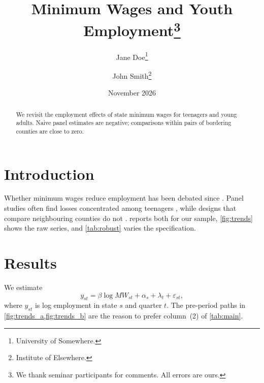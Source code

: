 \documentclass[11pt]{article}
\begin{document}
\title{Minimum Wages and Youth Employment\thanks{We thank seminar participants for comments. All errors are ours.}}
\author{Jane Doe\thanks{University of Somewhere.} \and John Smith\thanks{Institute of Elsewhere.}}
\date{November 2026}
\maketitle

\begin{abstract}
We revisit the employment effects of state minimum wages for teenagers and young adults. Naive panel estimates are negative; comparisons within pairs of bordering counties are close to zero.
\end{abstract}

\section{Introduction}
\label{sec:intro}

Whether minimum wages reduce employment has been debated since \citet{card1994}. Panel studies
often find losses concentrated among teenagers \citep{neumark2008}, while designs that compare
neighbouring counties do not \citep{dube2010,cengiz2019}.  reports both for our
sample, \cref{fig:trends} shows the raw series, and \cref{tab:robust} varies the specification.

\section{Results}
\label{sec:results}

We estimate
\begin{equation}
  y_{st} = \beta \log \mathit{MW}_{st} + \alpha_s + \lambda_t + \varepsilon_{st},
  \label{eq:main}
\end{equation}
where $y_{st}$ is log employment in state $s$ and quarter $t$. The pre-period paths in \cref{fig:trends_a,fig:trends_b} are the reason to prefer column~(2) of \cref{tab:main}.
\end{document}
